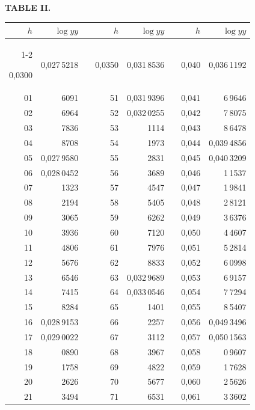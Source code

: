 \endgroup
\clearpage
{}
\begingroup
\centering
\fontsize{9}{9}\selectfont
\setlength{\tabcolsep}{8pt}
\renewcommand{\arraystretch}{1}
\setlength{\parskip}{0pt}
\textbf{TABLE II.}
\par\vspace{7pt}
\begin{tabular}{|r|r|@{}p{9pt}@{}|r|r|@{}p{9pt}@{}|r|r|}
\hline
\rule{0pt}{8.5pt}\(h\) & \(\log yy\) & & \(h\) & \(\log yy\) & & \(h\) & \(\log yy\) \\
\cline{1-2}\cline{4-5}\cline{7-8}
\rule{0pt}{8.5pt}0,0300 & 0,027\,5218 &  & 0,0350 & 0,031\,8536 &  & 0,040 & 0,036\,1192 \\
01 & 6091 &  & 51 & 0,031\,9396 &  & 0,041 & 6\,9646 \\
02 & 6964 &  & 52 & 0,032\,0255 &  & 0,042 & 7\,8075 \\
03 & 7836 &  & 53 & 1114 &  & 0,043 & 8\,6478 \\
04 & 8708 &  & 54 & 1973 &  & 0,044 & 0,039\,4856 \\
05 & 0,027\,9580 &  & 55 & 2831 &  & 0,045 & 0,040\,3209 \\[3pt]
06 & 0,028\,0452 &  & 56 & 3689 &  & 0,046 & 1\,1537 \\
07 & 1323 &  & 57 & 4547 &  & 0,047 & 1\,9841 \\
08 & 2194 &  & 58 & 5405 &  & 0,048 & 2\,8121 \\
09 & 3065 &  & 59 & 6262 &  & 0,049 & 3\,6376 \\
10 & 3936 &  & 60 & 7120 &  & 0,050 & 4\,4607 \\[3pt]
11 & 4806 &  & 61 & 7976 &  & 0,051 & 5\,2814 \\
12 & 5676 &  & 62 & 8833 &  & 0,052 & 6\,0998 \\
13 & 6546 &  & 63 & 0,032\,9689 &  & 0,053 & 6\,9157 \\
14 & 7415 &  & 64 & 0,033\,0546 &  & 0,054 & 7\,7294 \\
15 & 8284 &  & 65 & 1401 &  & 0,055 & 8\,5407 \\[3pt]
16 & 0,028\,9153 &  & 66 & 2257 &  & 0,056 & 0,049\,3496 \\
17 & 0,029\,0022 &  & 67 & 3112 &  & 0,057 & 0,050\,1563 \\
18 & 0890 &  & 68 & 3967 &  & 0,058 & 0\,9607 \\
19 & 1758 &  & 69 & 4822 &  & 0,059 & 1\,7628 \\
20 & 2626 &  & 70 & 5677 &  & 0,060 & 2\,5626 \\[3pt]
21 & 3494 &  & 71 & 6531 &  & 0,061 & 3\,3602 \\

\end{tabular}
